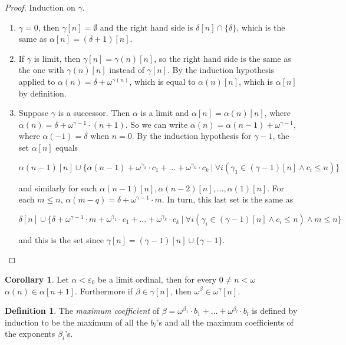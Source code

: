 \documentclass[8pt]{article}
\theoremstyle{definition}
\newtheorem{definition}{Definition}[section]
\theoremstyle{definition}
\theoremstyle{definition}
\theoremstyle{definition}
\theoremstyle{definition}
\theoremstyle{definition}
\theoremstyle{definition}
\theoremstyle{definition}
\theoremstyle{definition}
\theoremstyle{definition}
\theoremstyle{definition}
\theoremstyle{definition}
\theoremstyle{definition}
\newtheorem{col}{Corollary}[section]
\theoremstyle{question}
\begin{document}
\begin{proof}
  Induction on $\gamma$.

  \begin{enumerate}
    \item $\gamma = 0$, then $\gamma[n] = \emptyset$ and the right hand side is 
    $\delta[n] \cap \{ \delta \}$, which is the same as $\alpha[n] = (\delta + 1)[n]$.
    \item If $\gamma$ is limit, then $\gamma[n] = \gamma(n)[n]$, so the right hand side
    is the same as the one with $ \gamma(n)[n]$ instead of $\gamma[n]$. 
    By the induction hypothesis applied to $\alpha(n) = \delta + \omega^{\gamma(n)}$, which is equal to 
    $\alpha(n)[n]$, which is $\alpha[n]$ by definition.
    \item Suppose $\gamma$ is a successor. Then $\alpha$ is a limit and $\alpha[n] = \alpha(n)[n]$,
    where $\alpha(n) = \delta + \omega^{\gamma - 1} \cdot (n + 1)$.
    So we can write $\alpha(n) = \alpha(n - 1) + \omega^{\gamma - 1}$, where $\alpha(-1) = \delta$ when $n = 0$.
    By the induction hypothesis for $\gamma - 1$, the set $\alpha[n]$ equals
    \begin{center}
      $\alpha(n - 1)[n] \cup \{ \alpha(n - 1) + \omega^{\gamma_1} \cdot c_1 + \dots + \omega^{\gamma_k} \cdot c_k \: | \: \forall i (\gamma_1 \in (\gamma - 1)[n] \land c_i \leq n)\}$
    \end{center}
    and similarly for each $\alpha(n - 1)[n], \alpha(n - 2)[n], \dots, \alpha(1)[n]$. 
    For each $m \leq n$, $\alpha(m - q) = \delta + \omega^{\gamma - 1} \cdot m$. In turn, this last set is the same
    as
    \begin{center}
      $\delta[n] \cup \{ \delta + \omega^{\gamma - 1} \cdot m + \omega^{\gamma_1} \cdot c_1 + \dots + \omega^{\gamma_k} \cdot c_k \: | \: \forall i (\gamma_i \in (\gamma - 1)[n] \land c_i \leq n) \land m \leq n\}$
    \end{center}
    and this is the set since $\gamma[n] = (\gamma - 1)[n] \cup \{ \gamma - 1\}$.
  \end{enumerate}
\end{proof}

\begin{col}
  Let $\alpha < \varepsilon_0$ be a limit ordinal, then for every $0 \neq n < \omega$ $\alpha(n) \in \alpha[n + 1]$.
  Furthermore if $\beta \in \gamma[n]$, then $\omega^{\beta} \in \omega^{\gamma}[n]$.
\end{col}

\begin{definition}
The \emph{maximum coefficient} of $\beta = \omega^{\beta_1} \cdot b_1 + \dots + \omega^{\beta_l} \cdot b_l$
is defined by induction to be the maximum of all the $b_i$'s and all the maximum coefficients of the exponents $\beta_i$'s.
\end{definition}
\end{document}
